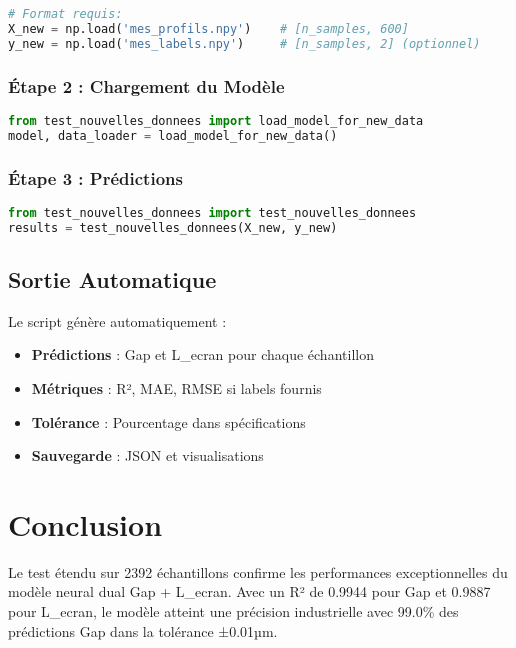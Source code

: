 \documentclass[10pt,twocolumn]{article}
\begin{document}
\begin{lstlisting}[language=Python, caption=Format des données requises]
# Format requis:
X_new = np.load('mes_profils.npy')    # [n_samples, 600]
y_new = np.load('mes_labels.npy')     # [n_samples, 2] (optionnel)
\end{lstlisting}

\subsubsection{Étape 2 : Chargement du Modèle}

\begin{lstlisting}[language=Python, caption=Chargement pour nouvelles données]
from test_nouvelles_donnees import load_model_for_new_data
model, data_loader = load_model_for_new_data()
\end{lstlisting}

\subsubsection{Étape 3 : Prédictions}

\begin{lstlisting}[language=Python, caption=Exécution des prédictions]
from test_nouvelles_donnees import test_nouvelles_donnees
results = test_nouvelles_donnees(X_new, y_new)
\end{lstlisting}

\subsection{Sortie Automatique}

Le script génère automatiquement :
\begin{itemize}
    \item \textbf{Prédictions} : Gap et L\_ecran pour chaque échantillon
    \item \textbf{Métriques} : R², MAE, RMSE si labels fournis
    \item \textbf{Tolérance} : Pourcentage dans spécifications
    \item \textbf{Sauvegarde} : JSON et visualisations
\end{itemize}

\section{Conclusion}

Le test étendu sur 2392 échantillons confirme les performances exceptionnelles du modèle neural dual Gap + L\_ecran. Avec un R² de 0.9944 pour Gap et 0.9887 pour L\_ecran, le modèle atteint une précision industrielle avec 99.0\% des prédictions Gap dans la tolérance ±0.01µm.
\end{document}
